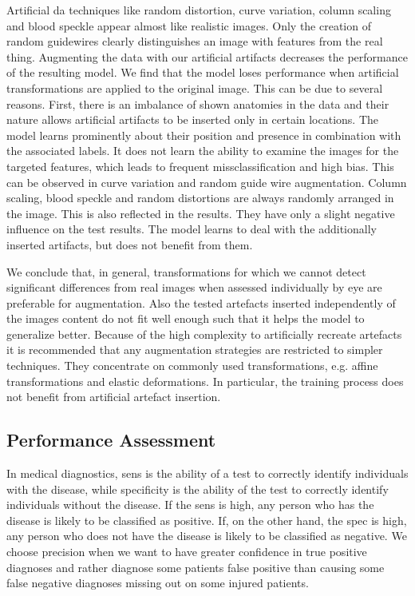 Artificial \acrshort{da} techniques like random distortion, curve variation, column scaling and blood speckle appear almost like realistic images. Only the creation of random guidewires clearly distinguishes an image with features from the real thing. Augmenting the data with our artificial artifacts decreases the performance of the resulting model. We find that the model loses performance when artificial transformations are applied to the original image. This can be due to several reasons. First, there is an imbalance of shown anatomies in the data and their nature allows artificial artifacts to be inserted only in certain locations. The model learns prominently about their position and presence in combination with the associated labels. It does not learn the ability to examine the images for the targeted features, which leads to frequent missclassification and high bias. This can be observed in curve variation and random guide wire augmentation. Column scaling, blood speckle and random distortions are always randomly arranged in the image. This is also reflected in the results. They have only a slight negative influence on the test results. The model learns to deal with the additionally inserted artifacts, but does not benefit from them.

We conclude that, in general, transformations for which we cannot detect significant differences from real images when assessed individually by eye are preferable for augmentation. Also the tested artefacts inserted independently of the images content do not fit well enough such that it helps the model to generalize better. Because of the high complexity to artificially recreate artefacts it is recommended that any augmentation strategies are restricted to simpler techniques. They concentrate on commonly used transformations, e.g. affine transformations and elastic deformations. In particular, the training process does not benefit from artificial artefact insertion.

\subsection{Performance Assessment}

In medical diagnostics, \acrshort{sens} is the ability of a test to correctly identify individuals with the disease, while specificity is the ability of the test to correctly identify individuals without the disease. If the \acrshort{sens} is high, any person who has the disease is likely to be classified as positive. If, on the other hand, the \acrshort{spec} is high, any person who does not have the disease is likely to be classified as negative. We choose precision when we want to have greater confidence in true positive diagnoses and rather diagnose some patients false positive than causing some false negative diagnoses missing out on some injured patients.

